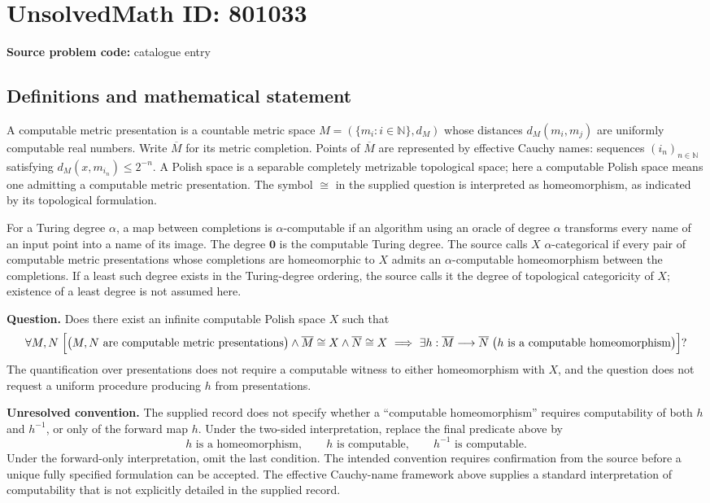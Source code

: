 \documentclass[11pt]{article}
\newcommand{\N}{\mathbb{N}}
\begin{document}
\section*{UnsolvedMath ID: 801033}
\textbf{Source problem code:} catalogue entry
\subsection{Definitions and mathematical statement}
A computable metric presentation is a countable metric space \(M=(\{m_i:i\in\N\},d_M)\) whose distances \(d_M(m_i,m_j)\) are uniformly computable real numbers. Write \(\overline M\) for its metric completion. Points of \(\overline M\) are represented by effective Cauchy names: sequences \((i_n)_{n\in\N}\) satisfying \(d_M(x,m_{i_n})\leq 2^{-n}\). A Polish space is a separable completely metrizable topological space; here a computable Polish space means one admitting a computable metric presentation. The symbol \(\cong\) in the supplied question is interpreted as homeomorphism, as indicated by its topological formulation.

For a Turing degree \(\alpha\), a map between completions is \(\alpha\)-computable if an algorithm using an oracle of degree \(\alpha\) transforms every name of an input point into a name of its image. The degree \(\mathbf 0\) is the computable Turing degree. The source calls \(X\) \(\alpha\)-categorical if every pair of computable metric presentations whose completions are homeomorphic to \(X\) admits an \(\alpha\)-computable homeomorphism between the completions. If a least such degree exists in the Turing-degree ordering, the source calls it the degree of topological categoricity of \(X\); existence of a least degree is not assumed here.

\textbf{Question.} Does there exist an infinite computable Polish space \(X\) such that
\[
\forall M,N\;\Bigl[
\bigl(M,N\text{ are computable metric presentations}\bigr)
\land \overline M\cong X\land\overline N\cong X
\ \Longrightarrow\
\exists h:\overline M\longrightarrow\overline N\;
\bigl(h\text{ is a computable homeomorphism}\bigr)
\Bigr]?
\]
The quantification over presentations does not require a computable witness to either homeomorphism with \(X\), and the question does not request a uniform procedure producing \(h\) from presentations.

\textbf{Unresolved convention.} The supplied record does not specify whether a ``computable homeomorphism'' requires computability of both \(h\) and \(h^{-1}\), or only of the forward map \(h\). Under the two-sided interpretation, replace the final predicate above by
\[
 h\text{ is a homeomorphism},\qquad
 h\text{ is computable},\qquad h^{-1}\text{ is computable}.
\]
Under the forward-only interpretation, omit the last condition. The intended convention requires confirmation from the source before a unique fully specified formulation can be accepted. The effective Cauchy-name framework above supplies a standard interpretation of computability that is not explicitly detailed in the supplied record.
\end{document}
